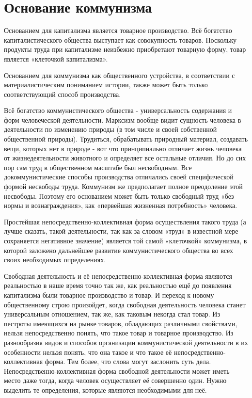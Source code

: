 \documentclass[12pt,a4paper,openany]{book}
\begin{document}
\section{Основание коммунизма}
\label{sec:03_osnovanie}

Основанием для капитализма является товарное производство. Всё богатство капиталистического общества выступает как совокупность товаров. Поскольку продукты труда при капитализме неизбежно приобретают товарную форму, товар является «клеточкой капитализма».

Основанием для коммунизма как общественного устройства, в соответствии с материалистическим пониманием истории, также может быть только соответствующий способ производства.

Всё богатство коммунистического общества - универсальность содержания и форм человеческой деятельности. Марксизм вообще видит сущность человека в деятельности по изменению природы (в том числе и своей собственной общественной природы). Трудиться, обрабатывать природный материал, создавать вещи, которых нет в природе - вот что принципиально отличает жизнь человека от жизнедеятельности животного и определяет все остальные отличия. Но до сих пор сам труд в общественном масштабе был несвободным. Все докоммунистические способы производства отличались своей специфической формой несвободы труда. Коммунизм же предполагает полное преодоление этой несвободы. Поэтому его основанием может быть только свободный труд «без нормы и вознаграждения», как «первейшая жизненная потребность» человека.

Простейшая непосредственно-коллективная форма осуществления такого труда (а лучше сказать, такой деятельности, так как за словом «труд» в известной мере сохраняется негативное значение) является той самой «клеточкой» коммунизма, в которой заложено дальнейшее развитие коммунистического общества во всех своих необходимых определениях.

Свободная деятельность и её непосредственно-коллективная форма являются реальностью в наше время точно так же, как реальностью ещё до появления капитализма были товарное производство и товар. И переход к новому общественному строю произойдет, когда свободная деятельность человека станет универсальным отношением, так же, как таковым некогда стал товар. Из пестроты имеющихся на рынке товаров, обладающих различными свойствами, нельзя непосредственно понять, что такое товар и товарное производство. Из разнообразия видов и способов организации коммунистической деятельности в их особенности нельзя понять, что она такое и что такое её непосредственно-коллективная форма. Тем более, что слова могут заслонить суть дела. Непосредственно-коллективная форма свободной деятельности может иметь место даже тогда, когда человек осуществляет её совершенно один. Нужно выделить те определения, которые являются необходимыми для неё.
\end{document}
